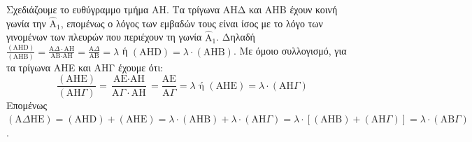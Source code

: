\begin{alist}
\begin{figure}
    \end{figure}
    Σχεδιάζουμε το ευθύγραμμο τμήμα ΑΗ.
    Τα τρίγωνα ΑΗΔ και ΑΗΒ έχουν κοινή γωνία την $\hat{\text{A}}_1$, επομένως ο λόγος των εμβαδών τους είναι ίσος με το λόγο των γινομένων των πλευρών που περιέχουν τη γωνία $\hat{\text{A}}_1$.
    Δηλαδή $\frac{(\text{AHD})}{(\text{AHB})} = \frac{\text{A}\Delta \cdot \text{AH}}{\text{AB} \cdot \text{AH}} = \frac{\text{A}\Delta}{\text{AB}} = \lambda$ ή $(\text{AHD}) = \lambda \cdot (\text{AHB})$.
    Με όμοιο συλλογισμό, για τα τρίγωνα ΑΗΕ και ΑΗΓ έχουμε ότι:
    \[ \frac{(\text{AHE})}{(\text{AH}\Gamma)} = \frac{\text{AE} \cdot \text{AH}}{\text{A}\Gamma \cdot \text{AH}} = \frac{\text{AE}}{\text{A}\Gamma} = \lambda \text{ ή } (\text{AHE}) = \lambda \cdot (\text{AH}\Gamma) \]
    Επομένως $(\text{A}\Delta\text{H}\text{E}) = (\text{AHD}) + (\text{AHE}) = \lambda \cdot (\text{AHB}) + \lambda \cdot (\text{AH}\Gamma) = \lambda \cdot [(\text{AHB}) + (\text{AH}\Gamma)] = \lambda \cdot (\text{AB}\Gamma)$. 
\end{alist}